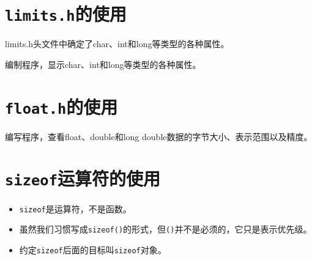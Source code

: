 
\section{\lstinline|limits.h|的使用}
\begin{frame} \ft{\secname}
limits.h头文件中确定了char、int和long等类型的各种属性。
\end{frame}

\begin{frame}\ft{\secname}
\begin{biancheng} 
编制程序，显示char、int和long等类型的各种属性。
\end{biancheng}
\end{frame}

\begin{frame}\ft{\secname}

\end{frame}


\section{\lstinline|float.h|的使用}
\begin{frame}\ft{\secname}
\begin{biancheng} 
编写程序，查看float、double和long double数据的字节大小、表示范围以及精度。
\end{biancheng}
\end{frame}

\begin{frame}\ft{\secname}

\end{frame}

\section{\lstinline|sizeof|运算符的使用}
\begin{frame}\ft{\secname}
  \begin{itemize}
  \item \lstinline|sizeof|是运算符，不是函数。 \\[.1in]
  \item [] 
    虽然我们习惯写成\lstinline|sizeof()|的形式，但\lstinline|()|并不是必须的，它只是表示优先级。\\[.1in]
  \item [] 约定\lstinline|sizeof|后面的目标叫\lstinline|sizeof|对象。
  \end{itemize}
\end{frame}

